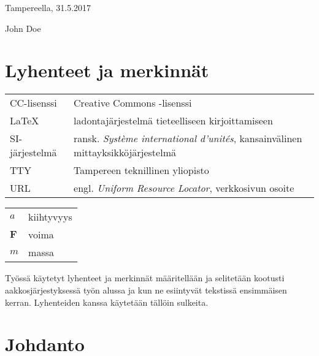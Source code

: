 \documentclass[globalnumbering,centeredcaptions,draftfooter]{tutthesis/tutthesis} %
\begin{document}
\vspace{2\baselineskip}

Tampereella, 31.5.2017

\vspace{2\baselineskip}

John Doe



\tableofcontents

\listoffigures



\chapter*{Lyhenteet ja merkinnät}


\begin{tabular}[h]{@{} p{} p{} @{}}
CC-lisenssi & Creative Commons -lisenssi \\
LaTeX & ladontajärjestelmä tieteelliseen kirjoittamiseen \\
SI-järjestelmä & ransk. \emph{Système international d'unités}, kansainvälinen mittayksikköjärjestelmä \\
TTY & Tampereen teknillinen yliopisto \\
URL & engl. \emph{Uniform Resource Locator}, verkkosivun osoite 
\end{tabular}

\begin{tabular}[h]{@{} p{} p{} @{}}
$a$ & kiihtyvyys \\
$\mathbf{F}$ & voima \\
$m$ & massa
\end{tabular}

Työssä käytetyt lyhenteet ja merkinnät määritellään ja selitetään kootusti aakkosjärjestyksessä työn alussa ja kun ne esiintyvät tekstissä ensimmäisen kerran. Lyhenteiden kanssa käytetään tällöin sulkeita.




\chapter{Johdanto}
\label{ch:johdanto}
\end{document}
